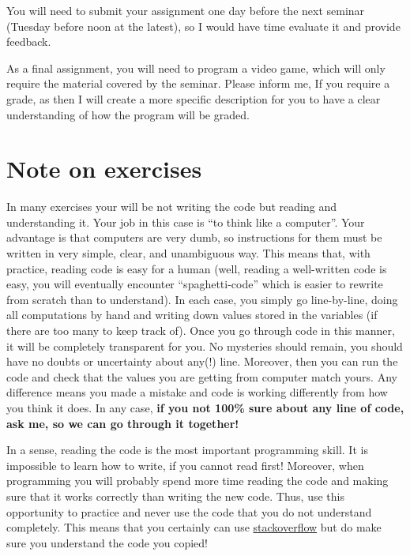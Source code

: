 \documentclass[
]{book}
\begin{document}
You will need to submit your assignment one day before the next seminar (Tuesday before noon at the latest), so I would have time evaluate it and provide feedback.

As a final assignment, you will need to program a video game, which will only require the material covered by the seminar. Please inform me, If you require a grade, as then I will create a more specific description for you to have a clear understanding of how the program will be graded.

\hypertarget{note-on-exercises}{%
\section*{Note on exercises}\label{note-on-exercises}}

In many exercises your will be not writing the code but reading and understanding it. Your job in this case is ``to think like a computer''. Your advantage is that computers are very dumb, so instructions for them must be written in very simple, clear, and unambiguous way. This means that, with practice, reading code is easy for a human (well, reading a well-written code is easy, you will eventually encounter ``spaghetti-code'' which is easier to rewrite from scratch than to understand). In each case, you simply go line-by-line, doing all computations by hand and writing down values stored in the variables (if there are too many to keep track of). Once you go through code in this manner, it will be completely transparent for you. No mysteries should remain, you should have no doubts or uncertainty about any(!) line. Moreover, then you can run the code and check that the values you are getting from computer match yours. Any difference means you made a mistake and code is working differently from how you think it does. In any case, \textbf{if you not 100\% sure about any line of code, ask me, so we can go through it together!}

In a sense, reading the code is the most important programming skill. It is impossible to learn how to write, if you cannot read first! Moreover, when programming you will probably spend more time reading the code and making sure that it works correctly than writing the new code. Thus, use this opportunity to practice and never use the code that you do not understand completely. This means that you certainly can use \href{https://stackoverflow.com/}{stackoverflow} but do make sure you understand the code you copied!
\end{document}
